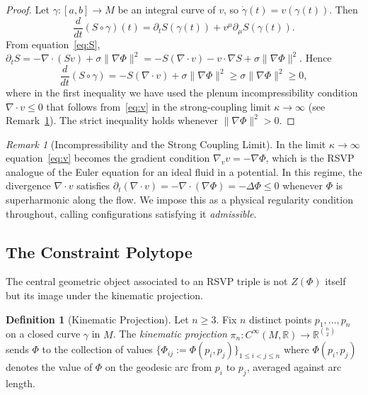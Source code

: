 \documentclass[12pt, oneside]{amsart}
\theoremstyle{plain}
\theoremstyle{definition}
\newtheorem{definition}[theorem]{Definition}
\theoremstyle{remark}
\newtheorem{remark}[theorem]{Remark}
\newcommand{\R}{\mathbb{R}}
\begin{document}
\begin{proof}
Let $\gamma: [a,b] \to M$ be an integral curve of $v$, so $\dot\gamma(t) = v(\gamma(t))$. Then
\[
  \frac{d}{dt}(S \circ \gamma)(t) = \partial_t S(\gamma(t)) + v^\mu \partial_\mu S(\gamma(t)).
\]
From equation~\eqref{eq:S}, $\partial_t S = -\nabla \cdot (Sv) + \sigma\|\nabla\Phi\|^2 = -S(\nabla \cdot v) - v \cdot \nabla S + \sigma\|\nabla\Phi\|^2$. Hence
\[
  \frac{d}{dt}(S \circ \gamma) = -S(\nabla \cdot v) + \sigma\|\nabla\Phi\|^2 \geq \sigma\|\nabla\Phi\|^2 \geq 0,
\]
where in the first inequality we have used the plenum incompressibility condition $\nabla \cdot v \leq 0$ that follows from~\eqref{eq:v} in the strong-coupling limit $\kappa \to \infty$ (see Remark~\ref{rem:incompress}). The strict inequality holds whenever $\|\nabla\Phi\|^2 > 0$.
\end{proof}

\begin{remark}[Incompressibility and the Strong Coupling Limit]
\label{rem:incompress}
In the limit $\kappa \to \infty$ equation~\eqref{eq:v} becomes the gradient condition $\nabla_v v = -\nabla\Phi$, which is the RSVP analogue of the Euler equation for an ideal fluid in a potential. In this regime, the divergence $\nabla \cdot v$ satisfies $\partial_t(\nabla \cdot v) = -\nabla \cdot (\nabla\Phi)= -\Delta\Phi \leq 0$ whenever $\Phi$ is superharmonic along the flow. We impose this as a physical regularity condition throughout, calling configurations satisfying it \emph{admissible}.
\end{remark}

\subsection{The Constraint Polytope}

The central geometric object associated to an RSVP triple is not $Z(\Phi)$ itself but its image under the kinematic projection.

\begin{definition}[Kinematic Projection]
\label{def:kinematic-proj}
Let $n \geq 3$. Fix $n$ distinct points $p_1, \ldots, p_n$ on a closed curve $\gamma$ in $M$. The \emph{kinematic projection} $\pi_n: C^\infty(M,\R) \to \R^{\binom{n}{2}}$ sends $\Phi$ to the collection of values $\{\Phi_{ij} := \Phi(p_i, p_j)\}_{1 \leq i < j \leq n}$ where $\Phi(p_i, p_j)$ denotes the value of $\Phi$ on the geodesic arc from $p_i$ to $p_j$, averaged against arc length.
\end{definition}
\end{document}
